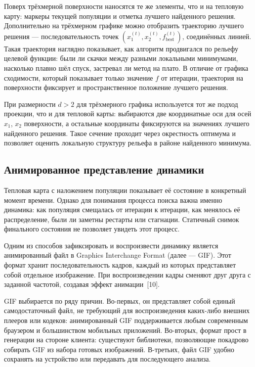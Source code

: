 \documentclass[14pt, russian]{scrartcl}
\begin{document}
Поверх трёхмерной поверхности наносятся те же элементы, что и на тепловую
карту: маркеры текущей популяции и отметка лучшего найденного решения.
Дополнительно на трёхмерном графике можно отобразить траекторию лучшего
решения --- последовательность точек $(x_1^{(t)}, x_2^{(t)},
f_{\text{best}}^{(t)})$, соединённых линией. Такая траектория наглядно
показывает, как алгоритм продвигался по рельефу целевой функции: были ли
скачки между разными локальными минимумами, насколько плавно шёл спуск,
застревал ли метод на плато. В отличие от графика сходимости, который
показывает только значение $f$ от итерации, траектория на поверхности
фиксирует и пространственное положение лучшего решения.

При размерности $d > 2$ для трёхмерного графика используется тот же
подход проекции, что и для тепловой карты: выбираются две координатные
оси для осей $x_1$, $x_2$ поверхности, а остальные координаты фиксируются
на значениях лучшего найденного решения. Такое сечение проходит через
окрестность оптимума и позволяет оценить локальную структуру рельефа
в районе найденного минимума.

\subsection{Анимированное представление динамики}

Тепловая карта с наложением популяции показывает её состояние в конкретный
момент времени. Однако для понимания процесса поиска важна именно
динамика: как популяция смещалась от итерации к итерации, как менялось
её распределение, были ли заметны рестарты или стагнации. Статичный
снимок финального состояния не позволяет увидеть этот процесс.

Одним из способов зафиксировать и воспроизвести динамику является
анимированный файл в Graphics Interchange Format (далее --- GIF). 
Этот формат хранит последовательность кадров, каждый из которых представляет собой
отдельное изображение. При воспроизведении кадры сменяют друг друга
с заданной частотой, создавая эффект анимации~[10].

GIF выбирается по ряду причин. Во-первых, он представляет собой единый
самодостаточный файл, не требующий для воспроизведения каких-либо
внешних плееров или кодеков: анимированный GIF поддерживается любым
современным браузером и большинством мобильных приложений. Во-вторых,
формат прост в генерации на стороне клиента: существуют библиотеки,
позволяющие покадрово собирать GIF из набора готовых изображений.
В-третьих, файл GIF удобно сохранять на устройство или передавать для
последующего анализа.
\end{document}
